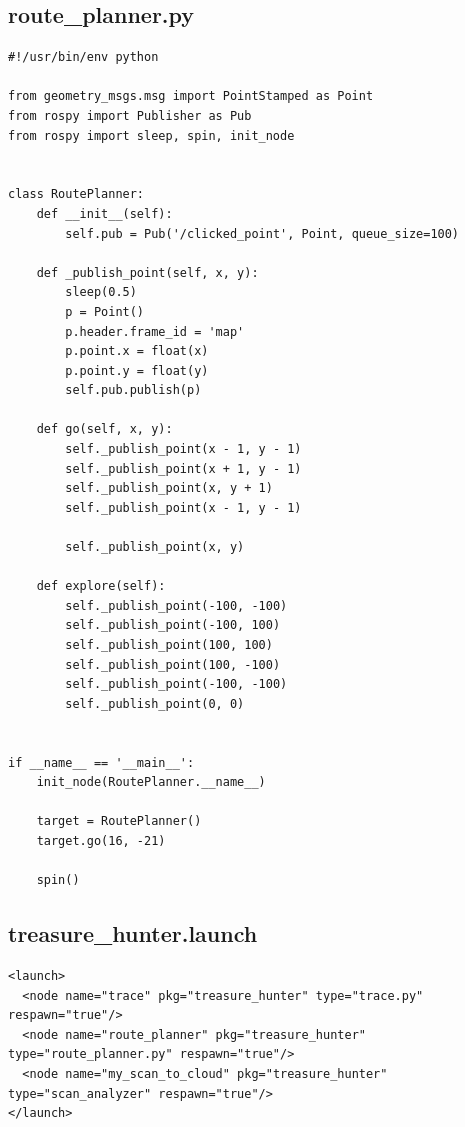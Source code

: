 \documentclass[14pt, a4paper]{extarticle}
\begin{document}
	\subsection{route\_planner.py}
\begin{lstlisting}
#!/usr/bin/env python

from geometry_msgs.msg import PointStamped as Point
from rospy import Publisher as Pub
from rospy import sleep, spin, init_node


class RoutePlanner:
    def __init__(self):
        self.pub = Pub('/clicked_point', Point, queue_size=100)

    def _publish_point(self, x, y):
        sleep(0.5)
        p = Point()
        p.header.frame_id = 'map'
        p.point.x = float(x)
        p.point.y = float(y)
        self.pub.publish(p)

    def go(self, x, y):
        self._publish_point(x - 1, y - 1)
        self._publish_point(x + 1, y - 1)
        self._publish_point(x, y + 1)
        self._publish_point(x - 1, y - 1)

        self._publish_point(x, y)

    def explore(self):
        self._publish_point(-100, -100)
        self._publish_point(-100, 100)
        self._publish_point(100, 100)
        self._publish_point(100, -100)
        self._publish_point(-100, -100)
        self._publish_point(0, 0)


if __name__ == '__main__':
    init_node(RoutePlanner.__name__)

    target = RoutePlanner()
    target.go(16, -21)

    spin()
\end{lstlisting}

	\subsection{treasure\_hunter.launch}
\begin{lstlisting}
<launch>
  <node name="trace" pkg="treasure_hunter" type="trace.py" respawn="true"/>
  <node name="route_planner" pkg="treasure_hunter" type="route_planner.py" respawn="true"/>
  <node name="my_scan_to_cloud" pkg="treasure_hunter" type="scan_analyzer" respawn="true"/>
</launch>
\end{lstlisting}
\end{document}
